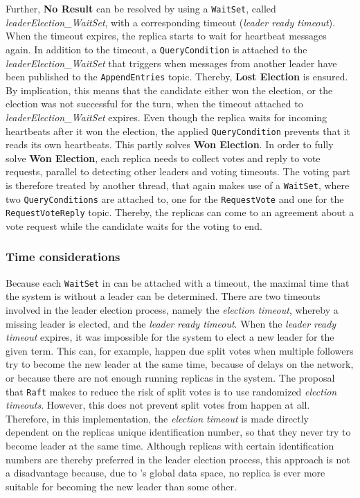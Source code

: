 Further, \textbf{No Result} can be resolved by using a \texttt{WaitSet}, called \textit{leaderElection\_WaitSet}, with a corresponding timeout (\textit{leader ready timeout}).
When the timeout expires, the replica starts to wait for heartbeat messages again.
In addition to the timeout, a \texttt{QueryCondition} is attached to the \textit{leaderElection\_WaitSet} that triggers when messages from another leader have been published to the \texttt{AppendEntries} topic.
Thereby, \textbf{Lost Election} is ensured.
By implication, this means that the candidate either won the election, or the election was not successful for the turn, when the timeout attached to \textit{leaderElection\_WaitSet} expires.
Even though the replica waits for incoming heartbeats after it won the election, the applied \texttt{QueryCondition} prevents that it reads its own heartbeats.
This partly solves \textbf{Won Election}.
In order to fully solve \textbf{Won Election}, each replica needs to collect votes and reply to vote requests, parallel to detecting other leaders and voting timeouts.
The voting part is therefore treated by another  thread, that again makes use of a \texttt{WaitSet}, where two \texttt{QueryConditions} are attached to, one for the \texttt{RequestVote} and one for the \texttt{RequestVoteReply} topic.
Thereby, the replicas can come to an agreement about a vote request while the candidate waits for the voting to end.

\subsubsection{Time considerations}
\label{subsub:timeConsiderations}
Because each \texttt{WaitSet} in  can be attached with a timeout, the maximal time that the system is without a leader can be determined.
There are two timeouts involved in the leader election process, namely the \textit{election timeout}, whereby a missing leader is elected, and the \textit{leader ready timeout}.
When the \textit{leader ready timeout} expires, it was impossible for the system to elect a new leader for the given term.
This can, for example, happen due split votes when multiple followers try to become the new leader at the same time, because of delays on the network, or because there are not enough running replicas in the system.
The proposal that \texttt{Raft} makes to reduce the risk of split votes is to use randomized \textit{election timeouts}.
However, this does not prevent split votes from happen at all.
Therefore, in this implementation, the \textit{election timeout} is made directly dependent on the replicas unique identification number, so that they never try to become leader at the same time.
Although replicas with certain identification numbers are thereby preferred in the leader election process, this approach is not a disadvantage because, due to 's global data space, no replica is ever more suitable for becoming the new leader than some other.

